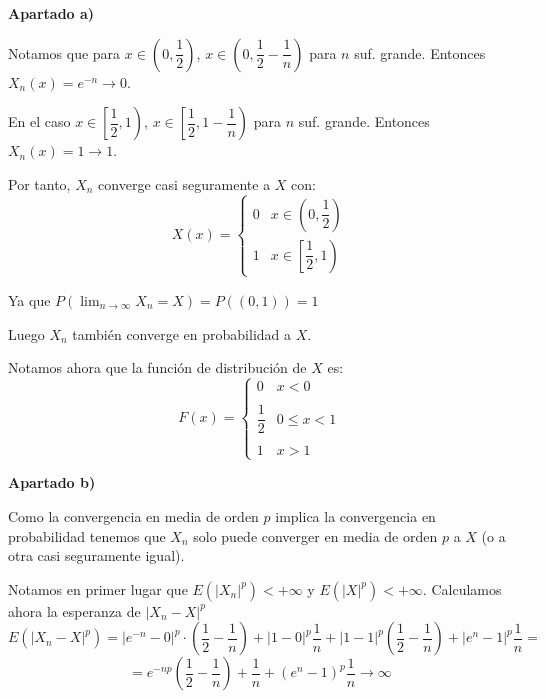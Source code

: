 \documentclass[openany]{book}
\begin{document}
\begin{exercise}
    $  $
    \begin{flushright}
        \textbf{Apartado a)}
    \end{flushright}
    
    
    Notamos que para $ x \in \left(0,\dfrac{1}{2}\right) $, $ x \in \left(0,\dfrac{1}{2}-\dfrac{1}{n}\right) $ para $ n $ suf. grande. Entonces $ X_n(x) =e^{-n}\to 0 $.
    
    En el caso $x \in  \left[\dfrac{1}{2},1\right)  $, $ x \in \left[\dfrac{1}{2},1-\dfrac{1}{n}\right) $ para $ n  $ suf. grande. Entonces $ X_n(x) = 1 \to 1 $.
    
    Por tanto, $ X_n $ converge casi seguramente a $ X $ con:
    $$ X(x) = \left\{
    \begin{array}{ll}
        0 & x \in \left(0,\dfrac{1}{2}\right)\\ 
        1 & x \in \left[\dfrac{1}{2},1\right)
    \end{array}
    \right. $$

    Ya que $ P(\lim_{n \to \infty}X_n = X) = P((0,1)) = 1 $

    Luego $ X_n $ también converge en probabilidad a $ X $.

    Notamos ahora que la función de distribución de $  X $ es:
    $$ F(x) = \left\{
    \begin{array}{ll}
        0 & x<0\\\\ 
        \dfrac{1}{2} & 0 \leq x < 1 \\\\ 
        1 & x>1
    \end{array}
    \right. $$

    \begin{flushright}
        \textbf{Apartado b)}
    \end{flushright}
    Como la convergencia en media de orden $ p $ implica la convergencia en probabilidad tenemos que $ X_n $ solo puede converger en media de orden $ p $ a $ X $ (o a otra casi seguramente igual).

    Notamos en primer lugar que $ E(|X_n|^{p}) <+\infty $ y $ E(|X|^{p}) <+\infty $. Calculamos ahora la esperanza de $ |X_n-X|^{p} $
    $$ E(|X_n-X|^{p}) = |e^{-n}-0|^{p}\cdot \left(\dfrac{1}{2}-\dfrac{1}{n}\right)+|1-0|^{p} \dfrac{1}{n} + |1-1|^{p}\left(\dfrac{1}{2}-\dfrac{1}{n}\right) + |e^{n}-1|^{p} \dfrac{1}{n} = $$ 
    $$ =  e^{-np}\left(\dfrac{1}{2}-\dfrac{1}{n}\right) +\dfrac{1}{n}+(e^{n}-1)^{p}\dfrac{1}{n} \to \infty  $$


\end{exercise}
\end{document}
